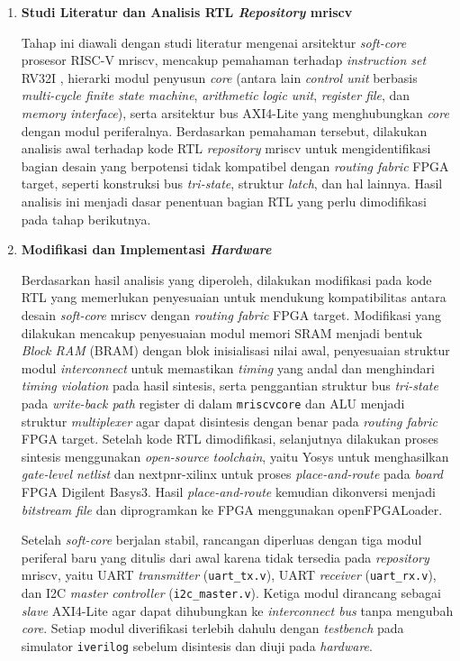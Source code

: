 \begin{enumerate}
	\item \textbf{Studi Literatur dan Analisis RTL \textit{Repository} mriscv}

	Tahap ini diawali dengan studi literatur mengenai arsitektur \textit{soft-core} prosesor RISC-V mriscv, mencakup pemahaman terhadap \textit{instruction set} RV32I \cite{waterman2016riscv}, hierarki modul penyusun \textit{core} (antara lain \textit{control unit} berbasis \textit{multi-cycle finite state machine}, \textit{arithmetic logic unit}, \textit{register file}, dan \textit{memory interface}), serta arsitektur bus AXI4-Lite yang menghubungkan \textit{core} dengan modul periferalnya. Berdasarkan pemahaman tersebut, dilakukan analisis awal terhadap kode RTL \textit{repository} mriscv untuk mengidentifikasi bagian desain yang berpotensi tidak kompatibel dengan \textit{routing fabric} FPGA target, seperti konstruksi bus \textit{tri-state}, struktur \textit{latch}, dan hal lainnya. Hasil analisis ini menjadi dasar penentuan bagian RTL yang perlu dimodifikasi pada tahap berikutnya.

	\item \textbf{Modifikasi dan Implementasi \textit{Hardware}}

	Berdasarkan hasil analisis yang diperoleh, dilakukan modifikasi pada kode RTL yang memerlukan penyesuaian untuk mendukung kompatibilitas antara desain \textit{soft-core} mriscv dengan \textit{routing fabric} FPGA target. Modifikasi yang dilakukan mencakup penyesuaian modul memori SRAM menjadi bentuk \textit{Block RAM} (BRAM) dengan blok inisialisasi nilai awal, penyesuaian struktur modul \textit{interconnect} untuk memastikan \textit{timing} yang andal dan menghindari \textit{timing violation} pada hasil sintesis, serta penggantian struktur bus \textit{tri-state} pada \textit{write-back path} register di dalam \texttt{mriscvcore} dan ALU menjadi struktur \textit{multiplexer} agar dapat disintesis dengan benar pada \textit{routing fabric} FPGA target. Setelah kode RTL dimodifikasi, selanjutnya dilakukan proses sintesis menggunakan \textit{open-source toolchain}, yaitu Yosys untuk menghasilkan \textit{gate-level netlist} dan nextpnr-xilinx untuk proses \textit{place-and-route} pada \textit{board} FPGA Digilent Basys3. Hasil \textit{place-and-route} kemudian dikonversi menjadi \textit{bitstream file} dan diprogramkan ke FPGA menggunakan openFPGALoader.

	Setelah \textit{soft-core} berjalan stabil, rancangan diperluas dengan tiga modul periferal baru yang ditulis dari awal karena tidak tersedia pada \textit{repository} mriscv, yaitu UART \textit{transmitter} (\texttt{uart\_tx.v}), UART \textit{receiver} (\texttt{uart\_rx.v}), dan I2C \textit{master controller} (\texttt{i2c\_master.v}). Ketiga modul dirancang sebagai \textit{slave} AXI4-Lite agar dapat dihubungkan ke \textit{interconnect bus} tanpa mengubah \textit{core}. Setiap modul diverifikasi terlebih dahulu dengan \textit{testbench} pada simulator \texttt{iverilog} sebelum disintesis dan diuji pada \textit{hardware}.


\end{enumerate}
